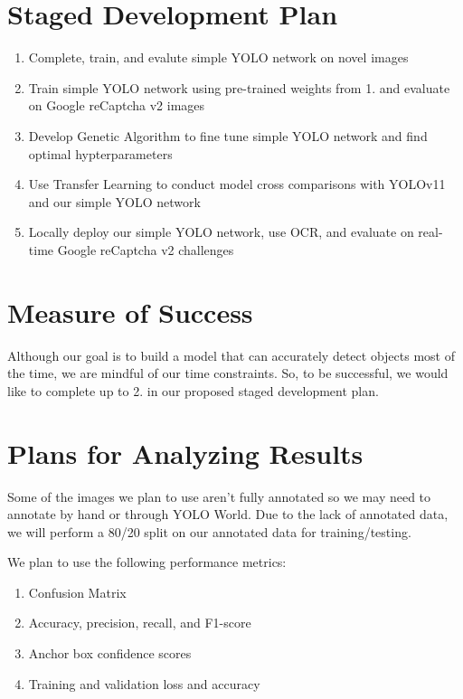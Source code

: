 \documentclass[11pt]{article}
\begin{document}
\section{Staged Development Plan}

\begin{enumerate}
    \item Complete, train, and evalute simple YOLO network on novel images
    \item Train simple YOLO network using pre-trained weights from 1. and evaluate on Google reCaptcha v2 images
    \item Develop Genetic Algorithm to fine tune simple YOLO network and find optimal hypterparameters
    \item Use Transfer Learning to conduct model cross comparisons with YOLOv11 and our simple YOLO network
    \item Locally deploy our simple YOLO network, use OCR, and evaluate on real-time Google reCaptcha v2 challenges
\end{enumerate}

\section{Measure of Success}

Although our goal is to build a model that can accurately detect objects most of the time, we are mindful of our time constraints. 
So, to be successful, we would like to complete up to 2. in our proposed staged development plan. 

\section{Plans for Analyzing Results}
Some of the images we plan to use aren't fully annotated so we may need to annotate by hand or through YOLO World. Due to the lack of annotated data,
we will perform a 80/20 split on our annotated data for training/testing.

We plan to use the following performance metrics:
\begin{enumerate}
    \item Confusion Matrix
    \item Accuracy, precision, recall, and F1-score
    \item Anchor box confidence scores
    \item Training and validation loss and accuracy
\end{enumerate}
\end{document}

